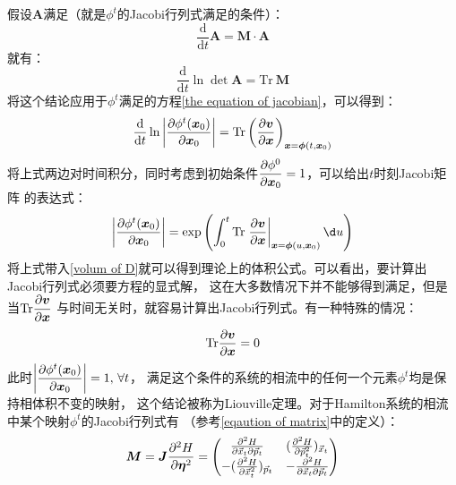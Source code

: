     假设$\bm{A}$满足（就是$\phi^t$的Jacobi行列式满足的条件）：
    \begin{equation}
        \frac {\mathrm{d}}{\mathrm{d}t} \bm{A} = \bm{M}\cdot\bm{A}
        \label{equation of matrix}
    \end{equation}
    就有：
    \begin{equation}
        \frac {\mathrm{d}}{\mathrm{d}t} \ln{\det{\bm{A}}} = \mathrm{Tr}\ \bm{M}
    \end{equation}
    将这个结论应用于$\phi^t$满足的方程\ref{the equation of jacobian}，可以得到：
    \begin{equation}
        \frac{\mathrm{d}{}}{\mathrm{d}{t}}\ln \left|\frac{\partial{\phi^t(\bm{x}_0)}}{\partial{\bm{x}_0}}\right| = \mathrm{Tr}\left(\frac{\partial{\bm{v}}}{\partial{\bm{x}}}\right)_{\bm{x} = \bm{\phi}(t, \bm{x}_0)}
    \end{equation}
    将上式两边对时间积分，同时考虑到初始条件$\displaystyle\frac{\partial{\phi^0}}{\partial{\bm{x}_0}} = 1$，可以给出$t$时刻Jacobi矩阵
    的表达式：
    \begin{equation}
        \left|\pdv{\phi^t(\bm{x}_0)}{\bm{x}_{0}}\right| = \exp\left(\int_{0}^{t}\mr{Tr}\left.
        \pdv{\bm{v}}{\bm{x}}\right|_{\bm{x} = \bm{\phi}(u, \bm{x}_0)}\d u\right)
        \label{expression of jacobian}
    \end{equation}
    将上式带入\ref{volum of D}就可以得到理论上的体积公式。可以看出，要计算出Jacobi行列式必须要方程的显式解，
    这在大多数情况下并不能够得到满足，但是当$\displaystyle\mathrm{Tr}\frac{\partial{\bm{v}}}{\partial{\bm{x}}}$
    与时间无关时，就容易计算出Jacobi行列式。有一种特殊的情况：
    \begin{equation}
        \mathrm{Tr}\frac{\partial{\bm{v}}}{\partial{\bm{x}}} = 0
    \end{equation}
    此时$\displaystyle\left|\frac{\partial{\phi^t(\bm{x}_0)}}{\partial{\bm{x}_0}}\right| = 1,\, \forall t$，
    满足这个条件的系统的相流中的任何一个元素$\phi^t$均是保持相体积不变的映射，
    这个结论被称为Liouville定理。对于Hamilton系统的相流中某个映射$\phi^t$的Jacobi行列式有
    （参考\ref{eqaution of matrix}中的定义）：
    \begin{equation}
        \bm{M} = \bm{J} \frac{\partial{^2 H}}{\partial{\bm{\eta}^2}}=
        \begin{pmatrix}
        \frac {\partial^2 H}{\partial \vec{x}_t \partial \vec{p}_t} & (\frac {\partial^2 H}{\partial \vec{p}_t^2})_{\vec{x}_t}\\
        -(\frac {\partial^2 H}{\partial \vec{x}_t^2})_{\vec{p}_t} & - \frac {\partial^2 H}{\partial \vec{x}_t \partial \vec{p}_t}
        \end{pmatrix}
    \end{equation}
